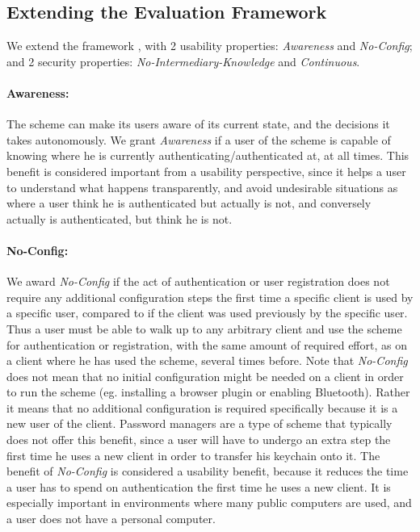 \subsection{Extending the Evaluation Framework}\label{sec:extending_framework}
We extend the framework \cite{bonneau2012quest}, with 2 usability properties: \textit{Awareness} and \textit{No-Config}; and 2 security properties: \textit{No-Intermediary-Knowledge} and \textit{Continuous}. 

\paragraph{Awareness:} The scheme can make its users aware of its current state, and the decisions it takes autonomously. We grant \textit{Awareness} if a user of the scheme is capable of knowing where he is currently authenticating/authenticated at, at all times. This benefit is considered important from a usability perspective, since it helps a user to understand what happens transparently, and avoid undesirable situations as where a user think he is authenticated but actually is not, and conversely actually is authenticated, but think he is not.
    
\paragraph{No-Config:} We award \textit{No-Config} if the act of authentication or user registration does not require any additional configuration steps the first time a specific client is used by a specific user, compared to if the client was used previously by the specific user. 
Thus a user must be able to walk up to any arbitrary client and use the scheme for authentication or registration, with the same amount of required effort, as on a client where he has used the scheme, several times before. Note that \textit{No-Config} does not mean that no initial configuration might be needed on a client in order to run the scheme (eg. installing a browser plugin or enabling Bluetooth). Rather it means that no additional configuration is required specifically because it is a new user of the client. Password managers are a type of scheme that typically does not offer this benefit, since a user will have to undergo an extra step the first time he uses a new client in order to transfer his keychain onto it. The benefit of \textit{No-Config} is considered a usability benefit, because it reduces the time a user has to spend on authentication the first time he uses a new client. It is especially important in environments where many public computers are used, and a user does not have a personal computer.
    
